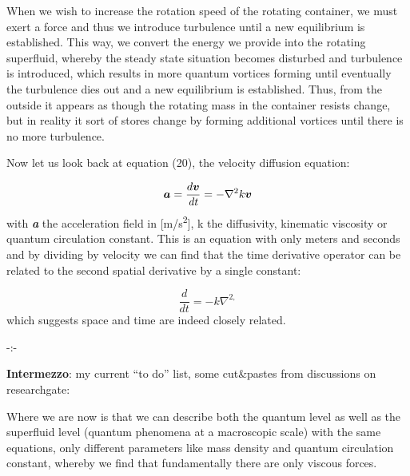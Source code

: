\documentclass[a4paper]{article}
\newcommand\textstyleNone[1]{#1}
\newcommand\boldsubformula[1]{\text{\mathversion{bold}$#1$}}
\begin{document}
{\color[rgb]{0.101960786,0.101960786,0.101960786}
\textstyleNone{When we wish to increase the rotation speed of the rotating container, we must exert a
{\textquotedbl}force{\textquotedbl} and thus we introduce turbulence until a new equilibrium is established. This way,
we convert the energy we provide into the rotating superfluid, whereby the steady state situation becomes disturbed and
turbulence is introduced, which results in more quantum vortices forming until eventually the turbulence dies out and a
new equilibrium is established. Thus, from the outside it appears as though the rotating mass in the container resists
change, but in reality it sort of stores {\textquotedbl}change{\textquotedbl} by forming additional vortices until
there is no more turbulence.}}

{\color[rgb]{0.101960786,0.101960786,0.101960786}
\textstyleNone{Now let us look back at equation (20),  the velocity diffusion equation:}}

\begin{equation}
\boldsubformula a=\frac{d\boldsubformula v}{\mathit{dt}}=-{\nabla}^2k\boldsubformula v
\end{equation}
{\color[rgb]{0.101960786,0.101960786,0.101960786}
\textstyleNone{with \textbf{\textit{a}} the acceleration field in [m/s\textsuperscript{2}],
}\textstyleNone{k}\textstyleNone{ the diffusivity, kinematic viscosity or quantum circulation constant. This is an
equation with only meters and seconds and by dividing by velocity we can find that the time derivative operator can be
related to the second spatial derivative by a single constant:}}

\begin{equation}
\frac d{\mathit{dt}}=-k{\nabla}^{2,}
\end{equation}
{\color[rgb]{0.101960786,0.101960786,0.101960786}
\textstyleNone{which suggests space and time are indeed closely related.}}

{\centering\color[rgb]{0.101960786,0.101960786,0.101960786}
\textstyleNone{{}-:-}
\par}

{\color[rgb]{0.101960786,0.101960786,0.101960786}
\textstyleNone{\textbf{Intermezzo}:  my current ``to do'' list, some cut\&pastes from discussions on researchgate:}}

{\color[rgb]{0.101960786,0.101960786,0.101960786}
\textstyleNone{Where we are now is that we can describe both the quantum level as well as the superfluid level (quantum
phenomena at a macroscopic scale) with the same equations, only different parameters like mass density and quantum
circulation constant, whereby we find that fundamentally there are only viscous forces.}}
\end{document}
